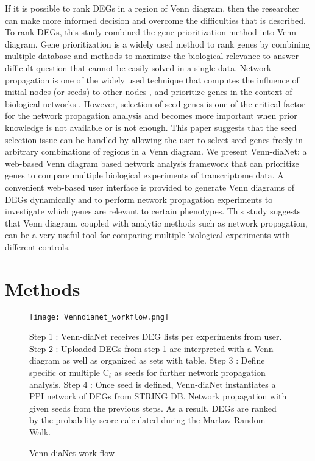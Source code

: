 \documentclass[oneside,phd]{snuthesis}
\begin{document}
If it is possible to rank DEGs in a region of Venn diagram, then the researcher can make more informed decision and overcome the difficulties that is described. 
To rank DEGs, this study combined the gene prioritization method into Venn diagram.
Gene prioritization is a widely used method to rank genes by combining multiple database and methods to maximize the biological relevance to answer difficult question that cannot be easily solved in a single data.
Network propagation is one of the widely used technique that computes the influence of initial nodes (or seeds) to other nodes \citep{cowen2017network}, and prioritize genes  in the context of biological networks \citep{li2010genome, smedley2014walking, kohler2008walking, vanunu2010associating, lee2011prioritizing, chen2009disease, chen2006mining}. 
However, selection of seed genes is one of the critical factor for the network propagation analysis and becomes more important when prior knowledge is not available or is not enough. 
This paper suggests that the seed selection issue can be handled by allowing the user to select seed genes freely in arbitrary combinations of regions in a Venn diagram. We present Venn-diaNet: a web-based Venn diagram based network analysis framework that can prioritize genes to compare multiple biological experiments of transcriptome data.
A convenient web-based user interface is provided to generate Venn diagrams of DEGs dynamically and to perform network propagation experiments to investigate which genes are relevant to certain phenotypes.
This study suggests that Venn diagram, coupled with analytic methods such as network propagation, can be a very useful tool for comparing multiple biological experiments with different controls.


\section{Methods}

\begin{figure*}
\begin{center}
\texttt{[image: Venndianet\_workflow.png]}
\end{center}
\caption{Venn-diaNet work flow}
\label{workflow}
\scriptsize{Step 1 : Venn-diaNet receives DEG lists per experiments from user.
Step 2 : Uploaded DEGs from step 1 are interpreted with a Venn diagram as well as organized as sets with table.
Step 3 : Define specific or multiple C$_i$ as seeds for further network propagation analysis.
Step 4 : Once seed is defined, Venn-diaNet instantiates a PPI network of DEGs from STRING DB. Network propagation with given seeds from the previous steps. As a result, DEGs are ranked by the probability score calculated during the Markov Random Walk.}
\end{figure*}
\end{document}
